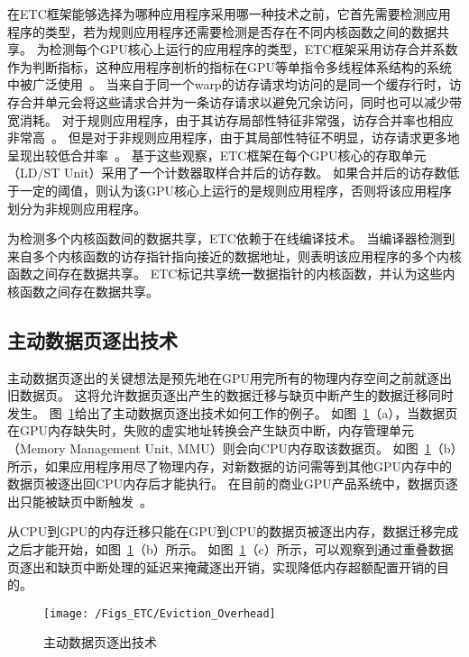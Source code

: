 在ETC框架能够选择为哪种应用程序采用哪一种技术之前，它首先需要检测应用程序的类型，若为规则应用程序还需要检测是否存在不同内核函数之间的数据共享。
为检测每个GPU核心上运行的应用程序的类型，ETC框架采用访存合并系数作为判断指标，这种应用程序剖析的指标在GPU等单指令多线程体系结构的系统中被广泛使用~。
当来自于同一个warp的访存请求均访问的是同一个缓存行时，访存合并单元会将这些请求合并为一条访存请求以避免冗余访问，同时也可以减少带宽消耗。
对于规则应用程序，由于其访存局部性特征非常强，访存合并率也相应非常高~。
但是对于非规则应用程序，由于其局部性特征不明显，访存请求更多地呈现出较低合并率~。
基于这些观察，ETC框架在每个GPU核心的存取单元（LD/ST Unit）采用了一个计数器取样合并后的访存数。
如果合并后的访存数低于一定的阈值，则认为该GPU核心上运行的是规则应用程序，否则将该应用程序划分为非规则应用程序。

为检测多个内核函数间的数据共享，ETC依赖于在线编译技术。
当编译器检测到来自多个内核函数的访存指针指向接近的数据地址，则表明该应用程序的多个内核函数之间存在数据共享。
ETC标记共享统一数据指针的内核函数，并认为这些内核函数之间存在数据共享。

\subsection{主动数据页逐出技术}

主动数据页逐出的关键想法是预先地在GPU用完所有的物理内存空间之前就逐出旧数据页。
这将允许数据页逐出产生的数据迁移与缺页中断产生的数据迁移同时发生。
图~\ref{fig:Eviction_Overhead}给出了主动数据页逐出技术如何工作的例子。
如图~\ref{fig:Eviction_Overhead}（a），当数据页在GPU内存缺失时，失败的虚实地址转换会产生缺页中断，内存管理单元（Memory Management Unit, MMU）则会向CPU内存取该数据页。
如图~\ref{fig:Eviction_Overhead}（b）所示，如果应用程序用尽了物理内存，对新数据的访问需等到其他GPU内存中的数据页被逐出回CPU内存后才能执行。
在目前的商业GPU产品系统中，数据页逐出只能被缺页中断触发~。

从CPU到GPU的内存迁移只能在GPU到CPU的数据页被逐出内存，数据迁移完成之后才能开始，如图~\ref{fig:Eviction_Overhead}（b）所示。
如图~\ref{fig:Eviction_Overhead}（c）所示，可以观察到通过重叠数据页逐出和缺页中断处理的延迟来掩藏逐出开销，实现降低内存超额配置开销的目的。

\begin{figure}[htbp] %
  \centering
  \texttt{[image: /Figs\_ETC/Eviction\_Overhead]}
  \caption{主动数据页逐出技术}
  \label{fig:Eviction_Overhead}
\end{figure}


